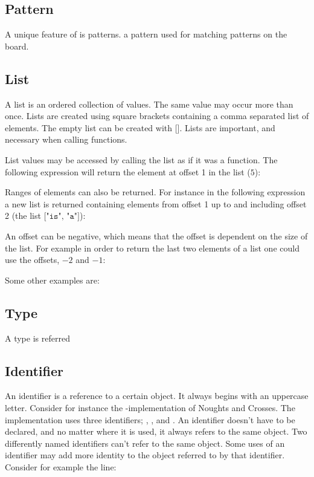 \subsection{Pattern}
A unique feature of \productname{} is patterns.
a pattern used for matching patterns on the board.

\subsection{List}
A list is an ordered collection of values. The same value may occur more than once. Lists are created using square brackets containing a comma separated list of elements. The empty list can be created with $\texttt{[]}$. Lists are important, and necessary when calling functions.

List values may be accessed by calling the list as if it was a function.
The following expression will return the element at offset 1 in the list
($5$):


Ranges of elements can also be returned. For instance in the following
expression a new list is returned containing elements from offset 1 up
to and including offset 2 (the list $\texttt{["is", "a"]}$):


An offset can be negative, which means that the offset is dependent on
the size of the list. For example in order to return the last two elements
of a list one could use the offsets, $-2$ and $-1$:


Some other examples are:


\subsection{Type}
A type is referred

\subsection{Identifier}
An identifier is a reference to a certain object. It always begins with an uppercase letter.
Consider for instance the \productname-implementation
of Noughts and Crosses. The implementation uses three identifiers; ,
, and . An identifier doesn't have to be declared, and no matter
where it is used, it always refers to the same object. Two differently named identifiers can't refer
to the same object. Some uses of an identifier may add more identity to the object referred to by that
identifier. Consider for example the line:

